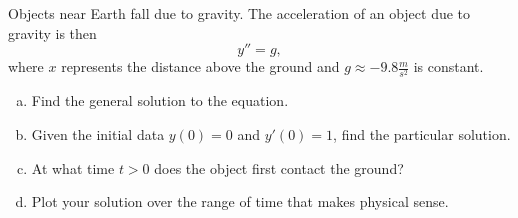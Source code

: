 \documentclass[12pt]{article} %
\begin{document}
\begin{problem}
Objects near Earth fall due to gravity.  The acceleration of an object due to gravity is then
\[
y''=g,
\]
where $x$ represents the distance above the ground and $g\approx -9.8\frac{m}{s^2}$ is constant.  
\begin{enumerate}[(a)]
    \item Find the general solution to the equation.
    \item Given the initial data $y(0)=0$ and $y'(0)=1$, find the particular solution.
    \item At what time $t>0$ does the object first contact the ground?
    \item Plot your solution over the range of time that makes physical sense.
\end{enumerate}

\end{problem}
\end{document}
